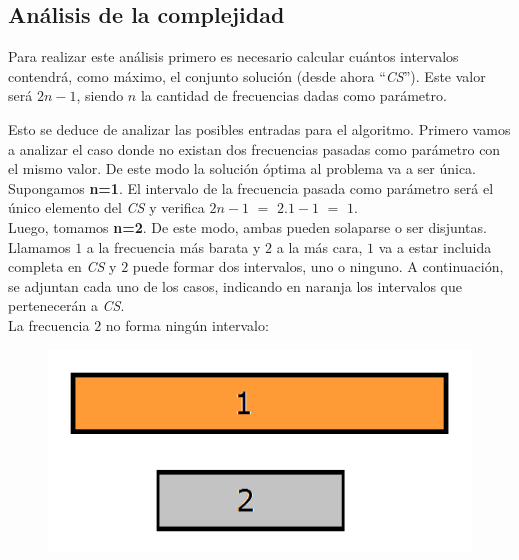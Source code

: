 

\newpage

\subsection{An\'alisis de la complejidad}

Para realizar este análisis primero es necesario calcular cu\'antos intervalos contendr\'a, como m\'aximo, el conjunto soluci\'on (desde ahora ``\emph{CS}''). Este valor ser\'a $2n-1$, siendo $n$ la cantidad de frecuencias dadas como par\'ametro.

Esto se deduce de analizar las posibles entradas para el algoritmo. Primero vamos a analizar el caso donde no existan dos frecuencias pasadas como par\'ametro con el mismo valor. De este modo la soluci\'on \'optima al problema va a ser \'unica. \\


Supongamos \textbf{n=1}. El intervalo de la frecuencia pasada como par\'ametro ser\'a el \'unico elemento del \emph{CS} y verifica $2n-1$ $=$ $2$.$1-1$ $=$ $1$.\\

Luego, tomamos \textbf{n=2}. De este modo, ambas pueden solaparse o ser disjuntas. Llamamos $1$ a la frecuencia m\'as barata y $2$ a la m\'as cara, $1$ va a estar incluida completa en \emph{CS} y $2$ puede formar dos intervalos, uno o ninguno. A continuaci\'on, se adjuntan cada uno de los casos, indicando en naranja los intervalos que pertenecer\'an a \emph{CS}.\\

La frecuencia $2$ no forma ning\'un intervalo:

 \begin{figure}[h!]
   \begin{center}
 	\includegraphics[scale=0.45]{imagenes/ej2/secuencias/Paso1/Caso0.png}
   \end{center}
 \end{figure}

